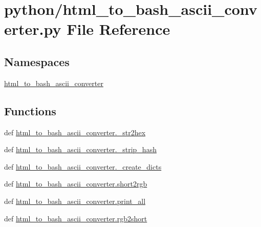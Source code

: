 \section{python/html\-\_\-to\-\_\-bash\-\_\-ascii\-\_\-converter.py File Reference}
\label{html__to__bash__ascii__converter_8py}
\subsection*{Namespaces}
\begin{DoxyCompactItemize}
\item 
\hyperlink{namespacehtml__to__bash__ascii__converter}{html\-\_\-to\-\_\-bash\-\_\-ascii\-\_\-converter}
\end{DoxyCompactItemize}
\subsection*{Functions}
\begin{DoxyCompactItemize}
\item 
def \hyperlink{namespacehtml__to__bash__ascii__converter_a3b9f5fd3c97b5c8b7333abbd0568323d}{html\-\_\-to\-\_\-bash\-\_\-ascii\-\_\-converter.\-\_\-str2hex}
\item 
def \hyperlink{namespacehtml__to__bash__ascii__converter_a6e7ad33e9bf85bf2632b3ac5c89f18bf}{html\-\_\-to\-\_\-bash\-\_\-ascii\-\_\-converter.\-\_\-strip\-\_\-hash}
\item 
def \hyperlink{namespacehtml__to__bash__ascii__converter_aeb6bf817c2e2c3970813b6034d1900c4}{html\-\_\-to\-\_\-bash\-\_\-ascii\-\_\-converter.\-\_\-create\-\_\-dicts}
\item 
def \hyperlink{namespacehtml__to__bash__ascii__converter_a745280733af625472cc51ab206a4d1d2}{html\-\_\-to\-\_\-bash\-\_\-ascii\-\_\-converter.\-short2rgb}
\item 
def \hyperlink{namespacehtml__to__bash__ascii__converter_a3f5102f497963761def2ae8bb1ac66ba}{html\-\_\-to\-\_\-bash\-\_\-ascii\-\_\-converter.\-print\-\_\-all}
\item 
def \hyperlink{namespacehtml__to__bash__ascii__converter_a20af4bd8239fdfa16eec951663fd2a70}{html\-\_\-to\-\_\-bash\-\_\-ascii\-\_\-converter.\-rgb2short}
\end{DoxyCompactItemize}
